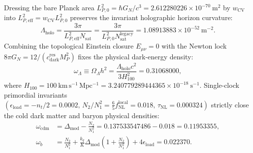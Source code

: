 \documentclass[11pt,letterpaper]{article}
\theoremstyle{plain}
\newcommand{\cdarkres}{c_{\text{dark}}^{\text{res}}}
\newcommand{\Lholo}{\Lambda_{\text{holo}}}
\newcommand{\Nsat}{N_{\text{sat}}}
\newcommand{\kmsmpc}{\mathrm{km\,s^{-1}\,Mpc^{-1}}}
\newcommand{\DeltaMod}{\Delta_{\text{mod}}}
\begin{document}
Dressing the bare Planck area $L_{P,0}^2 = \hbar G_N / c^3 = 2.612280226 \times 10^{-70}\ \mathrm{m}^2$ by $w_{\text{CV}}$ into $L_{P,\text{eff}}^2 = w_{\text{CV}} L_{P,0}^2$ preserves the invariant holographic horizon curvature:
\begin{equation}
\label{eq:lambda-holo-exact}
\Lholo = \frac{3\pi}{L_{P,\text{eff}}^2 \Nsat} = \frac{3\pi}{L_{P,0}^2 N_{\text{sat}}^{\text{legacy}}} = 1.08913883 \times 10^{-52}\ \mathrm{m}^{-2}.
\end{equation}
Combining the topological Einstein closure $E_{\mu\nu} = 0$ with the Newton lock $8\pi G_N = 12/(\cdarkres M_P^2)$ fixes the physical dark-energy density:
\begin{equation}
\label{eq:omega-lambda-exact}
\omega_\Lambda \equiv \Omega_\Lambda h^2 = \frac{\Lholo c^2}{3 H_{100}^2} = 0.31068000,
\end{equation}
where $H_{100} = 100\ \kmsmpc = 3.240779289444365 \times 10^{-18}\ \mathrm{s}^{-1}$.
Single-clock primordial invariants $(\epsilon_{\text{load}} = -n_t / 2 = 0.0002, \, N_2/N_1^2 = \frac{6}{5}f_{\text{NL}}^{\text{local}} = 0.018, \, \tau_{\text{NL}} = 0.000324)$ strictly close the cold dark matter and baryon physical densities:
\begin{align}
\label{eq:omega-cdm-exact}
\omega_{\text{cdm}} &= \DeltaMod - \frac{N_2}{N_1^2} = 0.137533547486 - 0.018 = 0.11953355, \\
\label{eq:omega-b-exact}
\omega_b &= \frac{N_2}{N_1^2} + \frac{k_q}{K}\DeltaMod\left(1 + \frac{N_2}{N_1^2}\right) + 4\epsilon_{\text{load}} = 0.022370.
\end{align}
\end{document}
